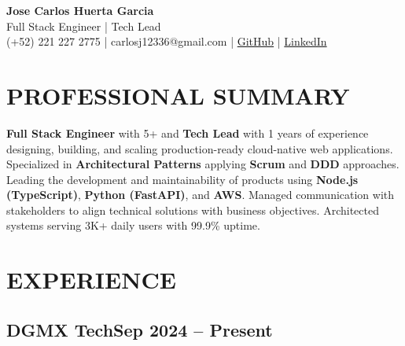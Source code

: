 \documentclass[a4paper,10pt]{article}
\newcommand{\kw}[1]{\textbf{\textcolor{keyword}{#1}}}
\begin{document}
\begin{center}
{\bfseries\LARGE Jose Carlos Huerta Garcia} \\
Full Stack Engineer | Tech Lead \\
(+52) 221 227 2775 | carlosj12336@gmail.com | \href{https://github.com/jcarloshg}{GitHub} | \href{https://www.linkedin.com/in/jose-carlos-huerta-garcia-773952212}{LinkedIn}
\end{center}

\section*{PROFESSIONAL SUMMARY}
\kw{Full Stack Engineer} with 5+ and \kw{Tech Lead} with 1 years of experience designing, building, and scaling production-ready cloud-native web applications. Specialized in \kw{Architectural Patterns} applying \kw{Scrum} and \kw{DDD} approaches. Leading the development and maintainability of products using \kw{Node.js (TypeScript)}, \kw{Python (FastAPI)}, and \kw{AWS}. Managed communication with stakeholders to align technical solutions with business objectives. Architected systems serving 3K+ daily users with 99.9\% uptime.

\section*{EXPERIENCE}

\subsection*{DGMX Tech\hfill\textbf{Sep 2024 -- Present}}
\end{document}
